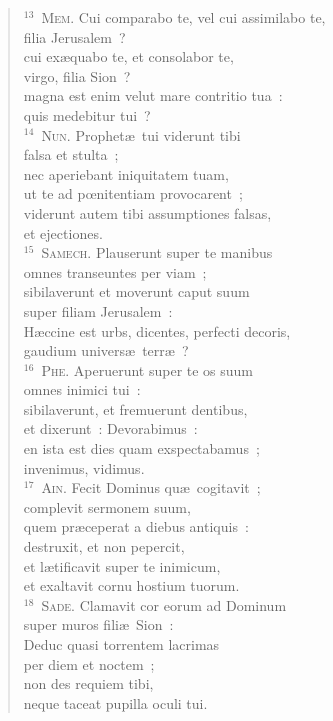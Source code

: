 \begin{flushleft}
\begin{verse}
${}^{13}$~\textsc{Mem.} Cui comparabo te, vel cui assimilabo te,\\ filia Jerusalem~?\\ cui ex\ae quabo te, et consolabor te,\\ virgo, filia Sion~?\\ magna est enim velut mare contritio tua~:\\ quis medebitur tui~?\\
${}^{14}$~\textsc{Nun.} Prophet\ae\ tui viderunt tibi\\ falsa et stulta~;\\ nec aperiebant iniquitatem tuam,\\ ut te ad pœnitentiam provocarent~;\\ viderunt autem tibi assumptiones falsas,\\ et ejectiones.\\
${}^{15}$~\textsc{Samech.} Plauserunt super te manibus\\ omnes transeuntes per viam~;\\ sibilaverunt et moverunt caput suum\\ super filiam Jerusalem~:\\ H\ae ccine est urbs, dicentes, perfecti decoris,\\ gaudium univers\ae\ terr\ae~?\\
${}^{16}$~\textsc{Phe.} Aperuerunt super te os suum\\ omnes inimici tui~:\\ sibilaverunt, et fremuerunt dentibus,\\ et dixerunt~: Devorabimus~:\\ en ista est dies quam exspectabamus~;\\ invenimus, vidimus.\\
${}^{17}$~\textsc{Ain.} Fecit Dominus qu\ae\ cogitavit~;\\ complevit sermonem suum,\\ quem pr\ae ceperat a diebus antiquis~:\\ destruxit, et non pepercit,\\ et l\ae tificavit super te inimicum,\\ et exaltavit cornu hostium tuorum.\\
${}^{18}$~\textsc{Sade.} Clamavit cor eorum ad Dominum\\ super muros fili\ae\ Sion~:\\ Deduc quasi torrentem lacrimas\\ per diem et noctem~;\\ non des requiem tibi,\\ neque taceat pupilla oculi tui.\\

\end{verse}
\end{flushleft}
